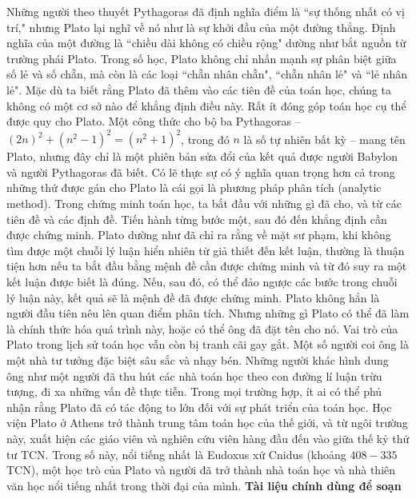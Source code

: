 \begin{multicols}{2}
		\vskip 0.1cm
		Những người theo thuyết Pythagoras đã định nghĩa điểm là ``sự thống nhất có vị trí," nhưng Plato lại nghĩ về nó như là sự khởi đầu của một đường thẳng.
		\vskip 0.1cm 
		Định nghĩa của một đường là ``chiều dài không có chiều rộng" dường như bắt nguồn từ trường phái Plato.
		\vskip 0.1cm
		Trong số học, Plato không chỉ nhấn mạnh sự phân biệt giữa số lẻ và số chẵn, mà còn là các loại ``chẵn nhân chẵn", ``chẵn nhân lẻ" và ``lẻ nhân lẻ". Mặc dù ta biết rằng Plato đã thêm vào các tiên đề của toán học, chúng ta không có một cơ sở nào để khẳng định điều này.
		\vskip 0.1cm
		Rất ít đóng góp toán học cụ thể được quy cho Plato. Một công thức cho bộ ba Pythagoras -- ${(2n)^2} + {({n^2} - 1)^2} = {({n^2} + 1)^2}$, trong đó  $n$ là số tự nhiên bất kỳ -- mang tên Plato, nhưng đây chỉ là một phiên bản sửa đổi của kết quả được người Babylon và người Pythagoras đã biết. 
		\vskip 0.1cm
		Có lẽ thực sự có ý nghĩa quan trọng hơn cả trong những thứ được gán cho Plato là cái gọi là phương pháp phân tích (analytic method).
		\vskip 0.1cm
		Trong chứng minh toán học, ta bắt đầu với những gì đã cho, và từ các tiên đề và các định đề. Tiến hành từng bước một, sau đó đến khẳng định cần được chứng minh.
		\vskip 0.1cm
		Plato dường như đã chỉ ra rằng  về mặt sư phạm, khi không tìm được một chuỗi lý luận hiển nhiên từ giả thiết đến kết luận, thường là thuận tiện hơn nếu ta bắt đầu bằng mệnh đề cần được chứng minh và từ đó suy ra một kết luận được biết là đúng. Nếu, sau đó, có thể đảo ngược các bước trong chuỗi lý luận này, kết quả sẽ là mệnh đề đã được chứng minh.
		\vskip 0.1cm
		Plato không hẳn là người đầu tiên nêu lên quan điểm phân tích.  Nhưng những gì Plato có thể đã làm là chính thức hóa quá trình này, hoặc có thể ông đã đặt tên cho nó.
		\vskip 0.1cm
		Vai trò của Plato trong lịch sử toán học vẫn còn bị tranh cãi gay gắt. Một số người coi ông là một nhà tư tưởng đặc biệt sâu sắc và nhạy bén. Những người khác hình dung ông như một người đã thu hút các nhà toán học theo con đường lí luận trừu tượng, đi xa những vấn đề thực tiễn. 
		\vskip 0.1cm
		Trong mọi trường hợp, ít ai có thể phủ nhận rằng Plato đã có tác động to lớn đối với sự phát triển của toán học. Học viện Plato ở Athens trở thành trung tâm toán học của thế giới, và từ ngôi trường này, xuất hiện các giáo viên và nghiên cứu viên hàng đầu đến vào giữa thế kỷ thứ tư TCN. Trong số này, nổi tiếng nhất là Eudoxus xứ Cnidus (khoảng $408-335$ TCN),  một học trò của Plato và người đã trở thành nhà toán học và nhà thiên văn học nổi tiếng nhất trong thời đại của mình.
		\vskip 0.1cm
		\textbf{\color{lichsutoanhoc}Tài liệu chính dùng để soạn}

\end{multicols}
